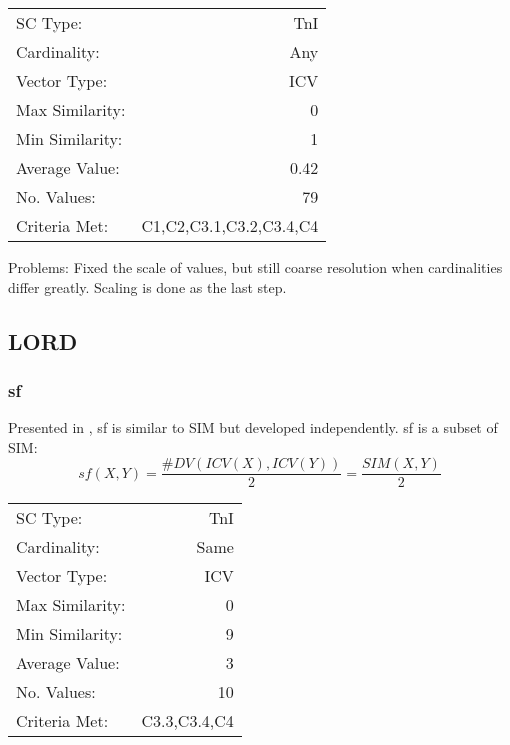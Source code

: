 \documentclass{article}
\begin{document}
\begin{center}
\begin{tabular}{lr}
 SC Type:         &                      TnI  \\
 Cardinality:     &                      Any  \\
 Vector Type:     &                      ICV  \\
 Max Similarity:  &                        0  \\
 Min Similarity:  &                        1  \\
 Average Value:   &                     0.42  \\
 No. Values:      &                       79  \\
 Criteria Met:    &  C1,C2,C3.1,C3.2,C3.4,C4  \\
\end{tabular}
\end{center}


Problems: Fixed the scale of values, but still coarse resolution when
cardinalities differ greatly. Scaling is done as the last step.
\subsection{LORD}
\label{sec-11-2}
\subsubsection{sf}
\label{sec-11-2-1}

Presented in \cite[pp. 93]{Lord1981}, sf is similar to SIM but
developed independently. sf is a subset of SIM:
$$sf\left(X,Y\right)=\frac{\#DV\left(ICV\left(X\right),ICV\left(Y\right)\right)}{2}=\frac{SIM(X,Y)}{2}$$

\begin{center}
\begin{tabular}{lr}
 SC Type:         &           TnI  \\
 Cardinality:     &          Same  \\
 Vector Type:     &           ICV  \\
 Max Similarity:  &             0  \\
 Min Similarity:  &             9  \\
 Average Value:   &             3  \\
 No. Values:      &            10  \\
 Criteria Met:    &  C3.3,C3.4,C4  \\
\end{tabular}
\end{center}
\end{document}
